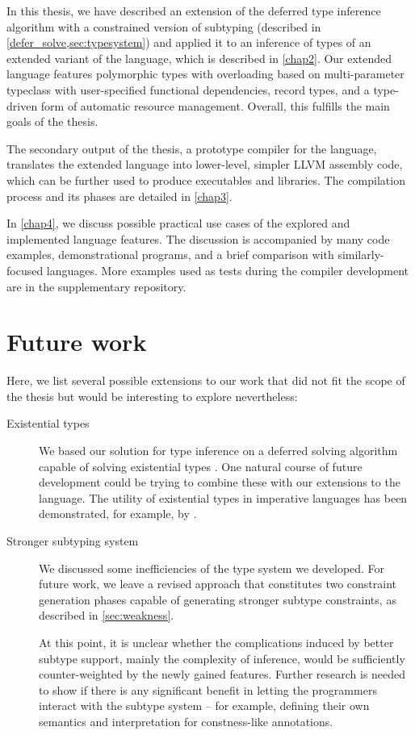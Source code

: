 
In this thesis, we have described an extension of the deferred type inference algorithm with a constrained version of subtyping (described in \cref{defer_solve,sec:typesystem}) and applied it to an inference of types of an extended variant of the \cmm language, which is described in \cref{chap2}. Our extended \cmm language features polymorphic types with overloading based on multi-parameter typeclass with user-specified functional dependencies, record types, and a type-driven form of automatic resource management. Overall, this fulfills the main goals of the thesis.

The secondary output of the thesis, a prototype compiler for the language, translates the extended \cmm language into lower-level, simpler LLVM assembly code, which can be further used to produce executables and libraries. The compilation process and its phases are detailed in \cref{chap3}.

In \cref{chap4}, we discuss possible practical use cases of the explored and implemented language features. The discussion is accompanied by many code examples, demonstrational programs, and a brief comparison with similarly-focused languages. More examples used as tests during the compiler development are in the supplementary repository\cmmrepo.

\section*{Future work}

Here, we list several possible extensions to our work that did not fit the scope of the thesis but would be interesting to explore nevertheless:

\begin{description}
    \item[Existential types] We based our solution for type inference on a deferred solving algorithm capable of solving existential types \cite{vytiniotis2011outsidein}. One natural course of future development could be trying to combine these with our extensions to the language. The utility of existential types in imperative languages has been demonstrated, for example, by \citet{grossman2002existential}.

    \item[Stronger subtyping system] We discussed some inefficiencies of the type system we developed. For future work, we leave a revised approach that constitutes two constraint generation phases capable of generating stronger subtype constraints, as described in \cref{sec:weakness}.

    At this point, it is unclear whether the complications induced by better subtype support, mainly the complexity of inference, would be sufficiently counter-weighted by the newly gained features. Further research is needed to show if there is any significant benefit in letting the programmers interact with the subtype system -- for example, defining their own semantics and interpretation for constness-like annotations.
\end{description}
